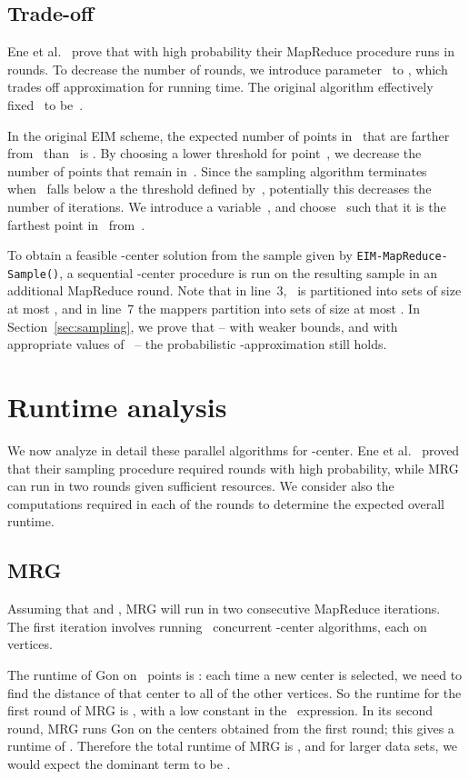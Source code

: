 \documentclass[11pt]{article}
\newcommand{\ours}{{\sc MRG}\xspace}
\newcommand{\ene}{{\sc EIM}\xspace}
\newcommand{\gon}{{\sc Gon}\xspace}
\begin{document}
\subsection{Trade-off}
Ene et al.~\cite{ene2011fast} prove that with high probability their MapReduce
procedure runs in  rounds.  
To decrease the number of rounds, we introduce parameter~ to
, which
trades off approximation for running time.
The original algorithm effectively fixed~ to be~.




In the original \ene scheme,
the expected number of points in~ that are farther from~ than~ is
.
By choosing a lower threshold for point~, we decrease the number of points that remain in~.
Since the sampling algorithm terminates when~ falls below a the threshold defined by~,
potentially this decreases the number of iterations.
We introduce a variable~, and choose~ such that it is
the  farthest point in~ from~. 



To obtain a feasible -center solution from the sample given by 
\texttt{EIM-MapReduce-Sample()},
a sequential -center procedure is run on the resulting sample
in an additional MapReduce round. 
Note that in line~3,~ is partitioned into  sets of size
at most , and in line~7 the mappers partition   into  sets of size at most  .
In Section~\ref{sec:sampling}, we prove that -- with weaker bounds, and with
appropriate values of~ -- the probabilistic
-approximation still holds.


\section{Runtime analysis}
\label{sec:runtime}


We now analyze in detail these parallel algorithms for -center.
Ene et al.~\cite{ene2011fast} proved that their sampling procedure required  rounds with high probability, while \ours can run in two rounds given sufficient resources.
We consider also the computations required in each of the rounds to determine the expected overall runtime.


\subsection{\ours}
Assuming that  and , \ours will run in two consecutive MapReduce iterations.
The first iteration involves running~ concurrent -center algorithms,
each on  vertices. 

The runtime of \gon on~ points is : each time a new center is selected, we need to find the distance of that center to all of the other vertices.
So the runtime for the first round of \ours is , with a low
constant in the~ expression.
In its second round, \ours runs \gon on the 
centers obtained from the first round; this gives a runtime of . 
Therefore the total runtime of \ours is , and 
for larger data sets, we would expect the dominant term to be . 
\end{document}
